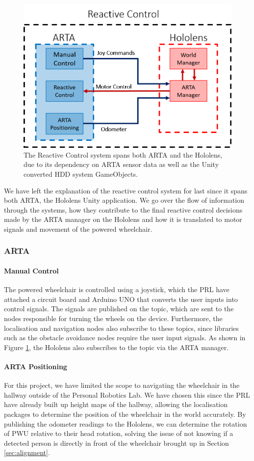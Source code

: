 \begin{figure}[ht]
    \centering
    \includegraphics[width=0.6\linewidth]{img/chapter5_implementation/reactiveControlSystem.png}
    \caption{The Reactive Control system spans both ARTA and the Hololens, due to its dependency on ARTA sensor data as well as the Unity converted HDD system GameObjects.}
    \label{fig:detailedReactive}
\end{figure}

We have left the explanation of the reactive control system for last since it spans both ARTA, the Hololens Unity application. We go over the flow of information through the systems, how they contribute to the final reactive control decisions made by the ARTA manager on the Hololens and how it is translated to motor signals and movement of the powered wheelchair.

\subsubsection{ARTA}
\paragraph{Manual Control} The powered wheelchair is controlled using a joystick, which the PRL have attached a circuit board and Arduino UNO that converts the user inputs into control signals. The signals are published on the  topic, which are sent to the nodes responsible for turning the wheels on the device. Furthermore, the localisation and navigation nodes also subscribe to these topics, since libraries such as the obstacle avoidance nodes require the user input signals. As shown in Figure \ref{fig:detailedReactive}, the Hololens also subscribes to the topic via the ARTA manager.

\paragraph{ARTA Positioning} For this project, we have limited the scope to navigating the wheelchair in the hallway outside of the Personal Robotics Lab. We have chosen this since the PRL have already built up height maps of the hallway, allowing the localisation packages to determine the position of the wheelchair in the world accurately. By publishing the odometer readings to the Hololens, we can determine the rotation of PWU relative to their head rotation, solving the issue of not knowing if a detected person is directly in front of the wheelchair brought up in Section \ref{sec:alignment}.

